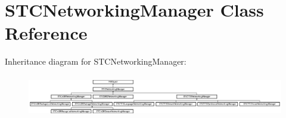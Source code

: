 \hypertarget{interface_s_t_c_networking_manager}{}\section{S\+T\+C\+Networking\+Manager Class Reference}
\label{interface_s_t_c_networking_manager}
Inheritance diagram for S\+T\+C\+Networking\+Manager\+:\begin{figure}[H]
\begin{center}
\leavevmode
\includegraphics[height=1.859230cm]{interface_s_t_c_networking_manager}
\end{center}
\end{figure}
